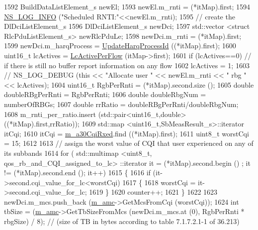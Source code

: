 \begin{DoxyCode}
1592       BuildDataListElement\_s newEl;
1593       newEl.m\_rnti = (*itMap).first;
1594       \hyperlink{group__logging_gafbd73ee2cf9f26b319f49086d8e860fb}{NS\_LOG\_INFO} (\textcolor{stringliteral}{"Scheduled RNTI:"}<<newEl.m\_rnti);
1595       \textcolor{comment}{// create the DlDciListElement\_s}
1596       DlDciListElement\_s newDci;
1597       std::vector <struct RlcPduListElement\_s> newRlcPduLe;
1598       newDci.m\_rnti = (*itMap).first;
1599       newDci.m\_harqProcess = \hyperlink{classns3_1_1CqaFfMacScheduler_a4aa696a41a5da8bea142e3a83d2880f3}{UpdateHarqProcessId} ((*itMap).first);
1600       uint16\_t lcActives = \hyperlink{classns3_1_1CqaFfMacScheduler_a53e0105147913d9c9800f8bb3d172676}{LcActivePerFlow} (itMap->first);
1601       \textcolor{keywordflow}{if} (lcActives==0)           \textcolor{comment}{// if there is still no buffer report information on any flow}
1602         lcActives = 1;
1603       \textcolor{comment}{// NS\_LOG\_DEBUG (this << "Allocate user " << newEl.m\_rnti << " rbg " << lcActives);}
1604       uint16\_t RgbPerRnti = (*itMap).second.size ();
1605       \textcolor{keywordtype}{double} doubleRBgPerRnti = RgbPerRnti;
1606       \textcolor{keywordtype}{double} doubleRbgNum = numberOfRBGs;
1607       \textcolor{keywordtype}{double} rrRatio = doubleRBgPerRnti/doubleRbgNum;
1608       m\_rnti\_per\_ratio.insert (std::pair<uint16\_t,double>((*itMap).first,rrRatio));
1609       std::map <uint16\_t,SbMeasResult\_s>::iterator itCqi;
1610       itCqi = \hyperlink{classns3_1_1CqaFfMacScheduler_a6894c40af99f8d6c6fdb201e7363fde9}{m\_a30CqiRxed}.find ((*itMap).first);
1611       uint8\_t worstCqi = 15;
1612 
1613       \textcolor{comment}{// assign the worst value of CQI that user experienced on any of its subbands}
1614       \textcolor{keywordflow}{for} ( std::multimap <uint8\_t, qos\_rb\_and\_CQI\_assigned\_to\_lc> ::iterator it = (*itMap).second.begin ()
      ; it != (*itMap).second.end (); it++)
1615         \{
1616           \textcolor{keywordflow}{if} (it->second.cqi\_value\_for\_lc<worstCqi)
1617             \{
1618               worstCqi = it->second.cqi\_value\_for\_lc;
1619             \}
1620           counter++;
1621         \}
1622 
1623       newDci.m\_mcs.push\_back (\hyperlink{classns3_1_1CqaFfMacScheduler_aa32ec6c7683816a4afdb922f73c0fdc6}{m\_amc}->GetMcsFromCqi (worstCqi));
1624       \textcolor{keywordtype}{int} tbSize = (\hyperlink{classns3_1_1CqaFfMacScheduler_aa32ec6c7683816a4afdb922f73c0fdc6}{m\_amc}->GetTbSizeFromMcs (newDci.m\_mcs.at (0), RgbPerRnti * rbgSize) / 8);         
        \textcolor{comment}{// (size of TB in bytes according to table 7.1.7.2.1-1 of 36.213)}

\end{DoxyCode}
